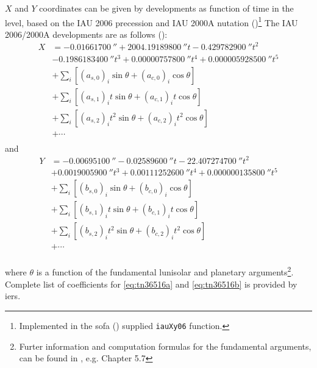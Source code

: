 $X$ and $Y$ coordinates can be given by developments as function of time in the 
\si{\micro\larcsecond} level, based on the IAU 2006 precession and IAU 2000A
nutation (\cite{CapitaineAndWallace2006})\footnote{Implemented in the \gls{sofa} (\cite{SOFA20210125}) supplied \texttt{iauXy06} function.}
The IAU 2006/2000A developments are as follows (\cite{iers2010}):
\begin{equation}
  \label{eq:tn36516a}
  \begin{aligned}
  X &= \SI{-0.01661700}{\arcsecond} + \SI{2004.19189800}{\arcsecond} t - \SI{0.429782900}{\arcsecond} t^2 \\
  &- \SI{0.1986183400}{\arcsecond}t^3 + \SI{0.00000757800}{\arcsecond} t^4 + \SI{0.000005928500}{\arcsecond} t^5 \\
  &+ \sum_{i} \left[ (a_{s,0})_i \sin \theta + (a_{c,0})_i \cos \theta \right] \\ 
  &+ \sum_{i} \left[ (a_{s,1})_i t \sin \theta + (a_{c,1})_i t \cos \theta \right] \\ 
  &+ \sum_{i} \left[ (a_{s,2})_i t^2 \sin \theta + (a_{c,2})_i t^2 \cos \theta \right] \\ 
  &+ \cdots \\
  \end{aligned}
\end{equation}
and
\begin{equation}
  \label{eq:tn36516b}
  \begin{aligned}
  Y &= -\SI{0.00695100}{\arcsecond} - \SI{0.02589600}{\arcsecond} t - \SI{22.407274700}{\arcsecond} t^2 \\
  &+ \SI{0.0019005900}{\arcsecond} t^3 + \SI{0.00111252600}{\arcsecond} t^4 + \SI{0.000000135800}{\arcsecond} t^5 \\
  &+ \sum_{i} \left[ (b_{s,0})_i \sin \theta     + (b_{c,0})_i \cos \theta \right] \\ 
  &+ \sum_{i} \left[ (b_{s,1})_i t \sin \theta   + (b_{c,1})_i t \cos \theta \right] \\ 
  &+ \sum_{i} \left[ (b_{s,2})_i t^2 \sin \theta + (b_{c,2})_i t^2 \cos \theta \right] \\ 
  &+ \cdots \\
  \end{aligned}
\end{equation}

where $\theta$ is a function of the fundamental lunisolar and planetary arguments\footnote{Furter information and computation formulas for the fundamental arguments, can be found in \cite{ires2010}, e.g. Chapter 5.7}. Complete 
list of coefficients for \ref{eq:tn36516a} and \ref{eq:tn36516b} is provided 
by \gls{iers}. 

